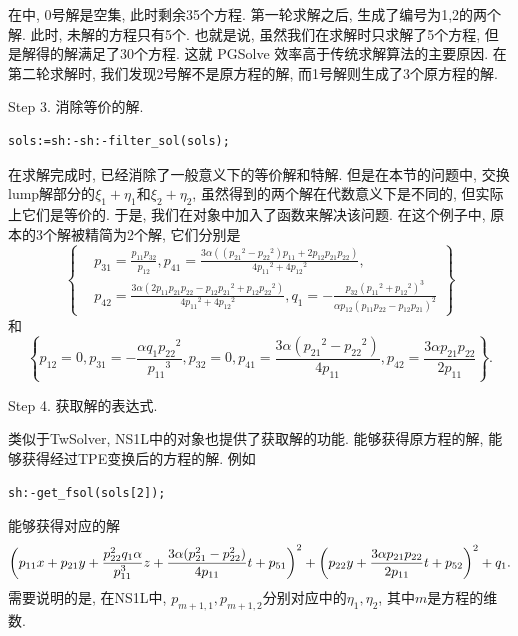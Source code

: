 在中, 0号解是空集, 此时剩余35个方程. 第一轮求解之后, 生成了编号为1,2的两个解. 此时, 未解的方程只有5个. 也就是说, 虽然我们在求解时只求解了5个方程, 但是解得的解满足了30个方程. 这就 PGSolve 效率高于传统求解算法的主要原因. 在第二轮求解时, 我们发现2号解不是原方程的解, 而1号解则生成了3个原方程的解. 

Step 3. 消除等价的解.
\begin{verbatim}
sols:=sh:-sh:-filter_sol(sols);
\end{verbatim}
在求解完成时, 已经消除了一般意义下的等价解和特解. 但是在本节的问题中, 交换lump解部分的$\xi_1+\eta_1$和$\xi_2+\eta_2$, 虽然得到的两个解在代数意义下是不同的, 但实际上它们是等价的. 于是, 我们在对象中加入了函数来解决该问题. 在这个例子中, 原本的3个解被精简为2个解, 它们分别是
\begin{equation}
\left\{ 
\begin{split}
&p_{{31}}={\frac {p_{{11}}p_{{32}}}{p_{{12}}}}, 
p_{{41}}={\frac {3\alpha \left(  \left( {p_{{21}}}^{2}-{p_{{22}}}^{2} \right) p_{{11}}+2p_{{12}}p_{{21}}p_{{22}} \right) }{4{p_{{11}}}^{2}+4{p_{{12}}}^{2}}}, \\
&p_{{42}}={\frac {3\alpha \left( 2p_{{11}}p_{{21}}p_{{22}}-p_{{12}}{p_{{21}}}^{2}+p_{{12}}{p_{{22}}}^{2}\right) }{4{p_{{11}}}^{2}+4{p_{{12}}}^{2}}}, 
q_{{1}}=-{\frac {p_{{32}} \left( {p_{{11}}}^{2}+{p_{{12}}}^{2} \right) ^{3}}{\alpha p_{{12}} \left( p_{{11}}p_{{22}}-p_{{12}}p_{{21}} \right) ^{2}}} 
\end{split}
\right\}  
\label{0S1L-1}
\end{equation}
和
\begin{equation}
 \left\{ p_{{12}}=0,p_{{31}}=-{\frac {\alpha q_{{1}}{p_{{22}}}^{2}
}{{p_{{11}}}^{3}}},p_{{32}}=0,p_{{41}}={\frac {3\alpha
 \left( {p_{{21}}}^{2}-{p_{{22}}}^{2} \right) }{4p_{{11}}}},p_{{42}
}={\frac {3\alpha p_{{21}}p_{{22}}}{2p_{{11}}}} \right\} . \label{0S1L-2}
\end{equation}

Step 4. 获取解的表达式.

类似于TwSolver, NS1L中的对象也提供了获取解的功能. 能够获得原方程的解, 能够获得经过TPE变换后的方程的解. 例如
\begin{verbatim}
sh:-get_fsol(sols[2]);
\end{verbatim}
能够获得对应的解 
\begin{equation}
\left(p_{11}x+p_{21}y+\frac{p_{22}^2q_1\alpha}{p_{11}^3}z+\frac{3\alpha (p_{21}^2-p_{22}^2)}{4p_{11}}t+p_{51}\right)^2
+\left(p_{22}y+\frac{3\alpha p_{21}p_{22}}{2p_{11}}t+p_{52}\right)^2+q_1 .
\end{equation}
需要说明的是, 在NS1L中, $p_{m+1,1},p_{m+1,2}$分别对应中的$\eta_1,\eta_2$, 其中$m$是方程的维数. 

